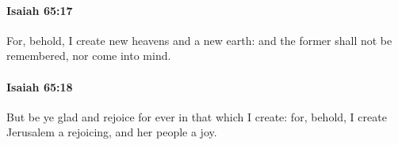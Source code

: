 		\paragraph{Isaiah 65:17} %
			\label{ISAIAH-65-17}

			For, behold, I create new heavens and a new earth: and the former shall not be remembered, nor come into mind.


		\paragraph{Isaiah 65:18} %
			\label{ISAIAH-65-18}

			But be ye glad and rejoice for ever in that which I create: for, behold, I create Jerusalem a rejoicing, and her people a joy.


